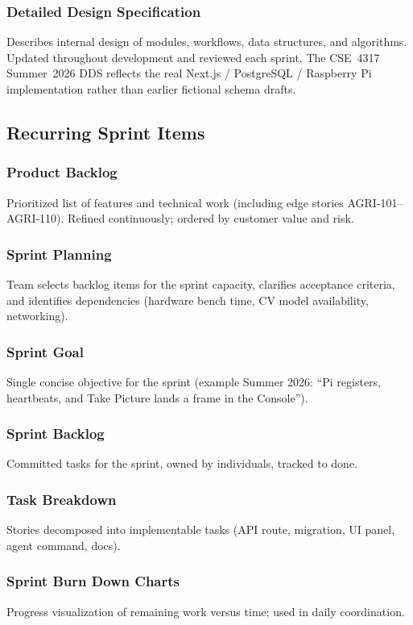 \documentclass[11pt,letterpaper]{article}
\begin{document}
\subsubsection{Detailed Design Specification}
Describes internal design of modules, workflows, data structures, and algorithms. Updated throughout
development and reviewed each sprint. The CSE~4317 Summer~2026 DDS reflects the real Next.js /
PostgreSQL / Raspberry Pi implementation rather than earlier fictional schema drafts.

\subsection{Recurring Sprint Items}
\subsubsection{Product Backlog}
Prioritized list of features and technical work (including edge stories AGRI-101--AGRI-110). Refined
continuously; ordered by customer value and risk.

\subsubsection{Sprint Planning}
Team selects backlog items for the sprint capacity, clarifies acceptance criteria, and identifies
dependencies (hardware bench time, CV model availability, networking).

\subsubsection{Sprint Goal}
Single concise objective for the sprint (example Summer 2026: ``Pi registers, heartbeats, and Take
Picture lands a frame in the Console'').

\subsubsection{Sprint Backlog}
Committed tasks for the sprint, owned by individuals, tracked to done.

\subsubsection{Task Breakdown}
Stories decomposed into implementable tasks (API route, migration, UI panel, agent command,
docs).

\subsubsection{Sprint Burn Down Charts}
Progress visualization of remaining work versus time; used in daily coordination.
\end{document}
